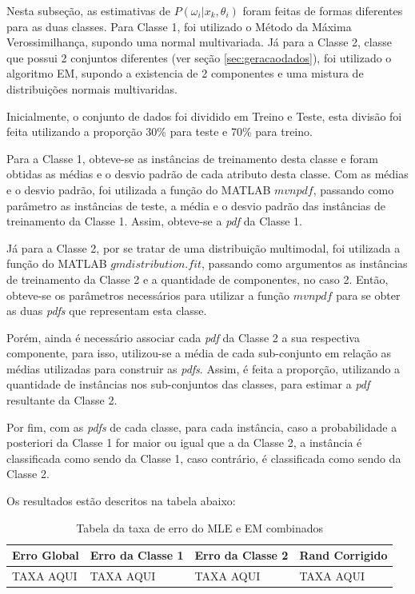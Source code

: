 Nesta subseção, as estimativas de $P(\omega_i | x_k, \theta_i)$ foram feitas de formas diferentes para as duas classes. Para Classe 1, foi utilizado o Método da Máxima Verossimilhança, supondo uma normal multivariada. Já para a Classe 2, classe que possui 2 conjuntos diferentes (ver seção \ref{sec:geracaodados}), foi utilizado o algoritmo EM, supondo a existencia de 2 componentes e uma mistura de distribuições normais multivaridas.

Inicialmente, o conjunto de dados foi dividido em Treino e Teste, esta divisão foi feita utilizando a proporção 30\% para teste e 70\% para treino.

Para a Classe 1, obteve-se as instâncias de treinamento desta classe e foram obtidas as médias e o desvio padrão de cada atributo desta classe. Com as médias e o desvio padrão, foi utilizada a função do MATLAB $mvnpdf$, passando como parâmetro as instâncias de teste, a média e o desvio padrão das instâncias de treinamento da Classe 1. Assim, obteve-se a \textit{pdf} da Classe 1.

Já para a Classe 2, por se tratar de uma distribuição multimodal, foi utilizada a função do MATLAB $gmdistribution.fit$, passando como argumentos as instâncias de treinamento da Classe 2 e a quantidade de componentes, no caso 2. Então, obteve-se os parâmetros necessários para utilizar a função $mvnpdf$ para se obter as duas \textit{pdfs} que representam esta classe.

Porém, ainda é necessário associar cada \textit{pdf} da Classe 2 a sua respectiva componente, para isso, utilizou-se a média de cada sub-conjunto em relação as médias utilizadas para construir as \textit{pdfs}. Assim, é feita a proporção, utilizando a quantidade de instâncias nos sub-conjuntos das classes, para estimar a \textit{pdf} resultante da Classe 2.

Por fim, com as \textit{pdfs} de cada classe, para cada instância, caso a probabilidade a posteriori da Classe 1 for maior ou igual que a da Classe 2, a instância é classificada como sendo da Classe 1, caso contrário, é classificada como sendo da Classe 2.

Os resultados estão descritos na tabela abaixo:

\begin{table}[H]
\begin{center}
\begin{tabular}{|l|l|l|l|}
\hline
Erro Global	&	Erro da Classe 1	&	Erro da Classe 2	&	Rand Corrigido	\\
\hline %
TAXA AQUI	&		TAXA AQUI		&		TAXA AQUI		&	TAXA AQUI		\\
\hline
\end{tabular}%
\end{center}   %
\caption{Tabela da taxa de erro do MLE e EM combinados}
\label{tab:erro-mle-em}
\end{table}

